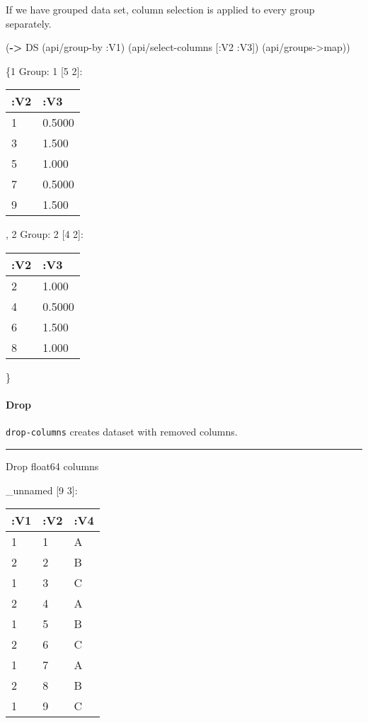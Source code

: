 \documentclass[]{article}
\newenvironment{Shaded}{\begin{snugshade}}{\end{snugshade}}
\newcommand{\KeywordTok}[1]{\textcolor[rgb]{0.13,0.29,0.53}{\textbf{#1}}}
\newcommand{\VariableTok}[1]{\textcolor[rgb]{0.00,0.00,0.00}{#1}}
\newcommand{\AttributeTok}[1]{\textcolor[rgb]{0.77,0.63,0.00}{#1}}
\newcommand{\NormalTok}[1]{#1}
\let\oldparagraph\paragraph
\renewcommand{\paragraph}[1]{\oldparagraph{#1}\mbox{}}
\begin{document}
If we have grouped data set, column selection is applied to every group
separately.

\begin{Shaded}
\begin{Highlighting}[]
\NormalTok{(}\KeywordTok{->}\NormalTok{ DS}
\NormalTok{    (api/group-by }\AttributeTok{:V1}\NormalTok{)}
\NormalTok{    (api/select-columns [}\AttributeTok{:V2} \AttributeTok{:V3}\NormalTok{])}
\NormalTok{    (api/groups->map))}
\end{Highlighting}
\end{Shaded}

\{1 Group: 1 {[}5 2{]}:

\begin{longtable}[]{@{}ll@{}}
\toprule
:V2 & :V3\tabularnewline
\midrule
\endhead
1 & 0.5000\tabularnewline
3 & 1.500\tabularnewline
5 & 1.000\tabularnewline
7 & 0.5000\tabularnewline
9 & 1.500\tabularnewline
\bottomrule
\end{longtable}

, 2 Group: 2 {[}4 2{]}:

\begin{longtable}[]{@{}ll@{}}
\toprule
:V2 & :V3\tabularnewline
\midrule
\endhead
2 & 1.000\tabularnewline
4 & 0.5000\tabularnewline
6 & 1.500\tabularnewline
8 & 1.000\tabularnewline
\bottomrule
\end{longtable}

\}

\paragraph{Drop}\label{drop}

\texttt{drop-columns} creates dataset with removed columns.

\begin{center}\rule{0.5\linewidth}{0.5pt}\end{center}

Drop float64 columns

\begin{Shaded}
\end{Shaded}

\_unnamed {[}9 3{]}:

\begin{longtable}[]{@{}lll@{}}
\toprule
:V1 & :V2 & :V4\tabularnewline
\midrule
\endhead
1 & 1 & A\tabularnewline
2 & 2 & B\tabularnewline
1 & 3 & C\tabularnewline
2 & 4 & A\tabularnewline
1 & 5 & B\tabularnewline
2 & 6 & C\tabularnewline
1 & 7 & A\tabularnewline
2 & 8 & B\tabularnewline
1 & 9 & C\tabularnewline
\bottomrule
\end{longtable}
\end{document}
